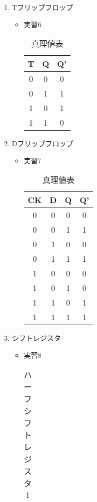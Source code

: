 \documentclass[dvipdfmx]{jsarticle}
\begin{document}
\begin{enumerate}
\begin{itemize}
\begin{table}[H]
						\end{table}
				\end{itemize}
			\item Tフリップフロップ
				\begin{itemize}
					\item 実習6
						\begin{table}[H]
							\center
							\caption{真理値表}
							\begin{tabular}{|c|c|c|}
								\hline
								T & Q & Q' \\ \hline
								0 & 0 & 0 \\ \hline
								0 & 1 & 1 \\ \hline
								1 & 0 & 1 \\ \hline
								1 & 1 & 0 \\ \hline
							\end{tabular}
						\end{table}
				\end{itemize}
			\item Dフリップフロップ
				\begin{itemize}
					\item 実習7
						\begin{table}[H]
							\center
							\caption{真理値表}
							\begin{tabular}{|c|c|c|c|}
								\hline
								CK & D & Q & Q' \\ \hline
								0 & 0 & 0 & 0 \\ \hline
								0 & 0 & 1 & 1 \\ \hline
								0 & 1 & 0 & 0 \\ \hline
								0 & 1 & 1 & 1 \\ \hline
								1 & 0 & 0 & 0 \\ \hline
								1 & 0 & 1 & 0 \\ \hline
								1 & 1 & 0 & 1 \\ \hline
								1 & 1 & 1 & 1 \\ \hline
							\end{tabular}
						\end{table}
				\end{itemize}
			\item シフトレジスタ
				\begin{itemize}
					\item 実習8
						\begin{table}[H]
							\center
							\caption{ハーフシフトレジスタ1}
							\begin{tabular}{|c|c|c|c|}
								\hline

\end{tabular}
\end{table}
\end{itemize}
\end{enumerate}
\end{document}
